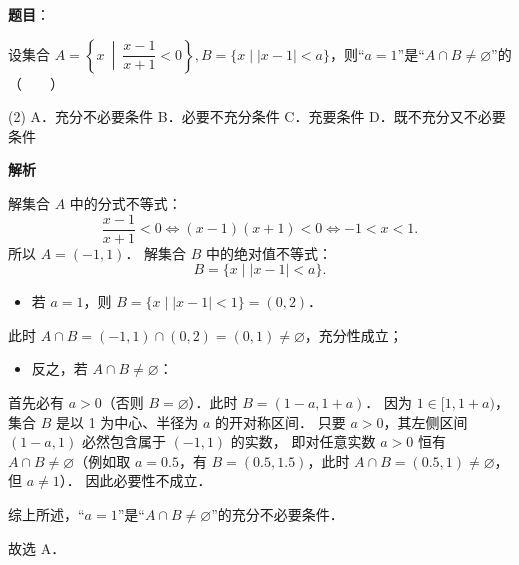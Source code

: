 \begin{answer}

\textbf{题目}：

设集合 $A = \left\{x \ \middle|\ \dfrac{x - 1}{x + 1} < 0\right\}, B = \{x \mid |x - 1| < a\}$，则“$a = 1$”是“$A \cap B \neq \varnothing$”的\mbox{（　　）}

\begin{gkopts}(2)
\task A．充分不必要条件
\task B．必要不充分条件
\task C．充要条件
\task D．既不充分又不必要条件
\end{gkopts}

\textbf{解析}

解集合 $A$ 中的分式不等式：
\nopagebreak[4]
\[
\frac{x - 1}{x + 1} < 0 \iff (x - 1)(x + 1) < 0 \iff -1 < x < 1.
\]
所以 $A = (-1, 1)$．
解集合 $B$ 中的绝对值不等式：
\nopagebreak[4]
\[
B = \{x \mid |x - 1| < a\}.
\]
\begin{itemize}
\item 若 $a = 1$，则 $B = \{x \mid |x - 1| < 1\} = (0, 2)$．
\end{itemize}
  此时 $A \cap B = (-1, 1) \cap (0, 2) = (0, 1) \neq \varnothing$，充分性成立；
\begin{itemize}
\item 反之，若 $A \cap B \neq \varnothing$：
\end{itemize}
  首先必有 $a > 0$（否则 $B = \varnothing$）．此时 $B = (1 - a, 1 + a)$．
  因为 $1 \in [1, 1 + a)$，集合 $B$ 是以 1 为中心、半径为 $a$ 的开对称区间．
  只要 $a > 0$，其左侧区间 $(1 - a, 1)$ 必然包含属于 $(-1, 1)$ 的实数，
  即对任意实数 $a > 0$ 恒有 $A \cap B \neq \varnothing$（例如取 $a = 0.5$，有 $B = (0.5, 1.5)$，此时 $A \cap B = (0.5, 1) \neq \varnothing$，但 $a \neq 1$）．
  因此必要性不成立．

综上所述，“$a = 1$”是“$A \cap B \neq \varnothing$”的充分不必要条件．

故选 A．


\end{answer}
